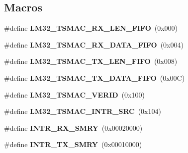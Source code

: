 \subsection*{Macros}
\begin{DoxyCompactItemize}
\item 
\mbox{\label{group__lm32__tsmac_gacde8e534cdeef805cde5277026f3982f}} 
\#define {\bfseries L\+M32\+\_\+\+T\+S\+M\+A\+C\+\_\+\+R\+X\+\_\+\+L\+E\+N\+\_\+\+F\+I\+FO}~(0x000)
\item 
\mbox{\label{group__lm32__tsmac_ga9fb53d149f042a07bde38062a9953129}} 
\#define {\bfseries L\+M32\+\_\+\+T\+S\+M\+A\+C\+\_\+\+R\+X\+\_\+\+D\+A\+T\+A\+\_\+\+F\+I\+FO}~(0x004)
\item 
\mbox{\label{group__lm32__tsmac_gaa14ee66c01fab78709c0b98343d05aad}} 
\#define {\bfseries L\+M32\+\_\+\+T\+S\+M\+A\+C\+\_\+\+T\+X\+\_\+\+L\+E\+N\+\_\+\+F\+I\+FO}~(0x008)
\item 
\mbox{\label{group__lm32__tsmac_gac84922a33b180933e148c983b2bf870b}} 
\#define {\bfseries L\+M32\+\_\+\+T\+S\+M\+A\+C\+\_\+\+T\+X\+\_\+\+D\+A\+T\+A\+\_\+\+F\+I\+FO}~(0x00\+C)
\item 
\mbox{\label{group__lm32__tsmac_gab0cfa6332fcc641a38b63f0c91955f41}} 
\#define {\bfseries L\+M32\+\_\+\+T\+S\+M\+A\+C\+\_\+\+V\+E\+R\+ID}~(0x100)
\item 
\mbox{\label{group__lm32__tsmac_gaeee7c2fa196c728c2df74ef04bdbb46c}} 
\#define {\bfseries L\+M32\+\_\+\+T\+S\+M\+A\+C\+\_\+\+I\+N\+T\+R\+\_\+\+S\+RC}~(0x104)
\item 
\mbox{\label{group__lm32__tsmac_gab95dcfbd3adead4e9fc65e435f653d84}} 
\#define {\bfseries I\+N\+T\+R\+\_\+\+R\+X\+\_\+\+S\+M\+RY}~(0x00020000)
\item 
\mbox{\label{group__lm32__tsmac_ga247aa5e8c8f47149ac59beed9d5b7517}} 
\#define {\bfseries I\+N\+T\+R\+\_\+\+T\+X\+\_\+\+S\+M\+RY}~(0x00010000)
\item 
\mbox{\label{group__lm32__tsmac_gaa5101b07463a55d464744c9aa8ab7aec}} 

\end{DoxyCompactItemize}
